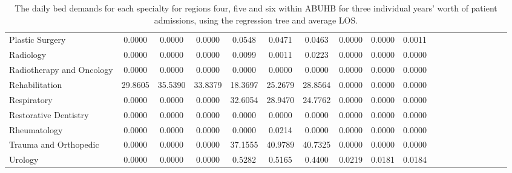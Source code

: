\documentclass[thesis.tex]{subfiles}
\begin{document}
\begin{landscape}
\begin{table}[h!]
{\begin{tabular}{lcccccccccccccccccc}
Plastic Surgery	&0.0000&	0.0000&	0.0000&	0.0548&	0.0471&	0.0463&	0.0000&	0.0000&	0.0011\\
Radiology&	0.0000&	0.0000&	0.0000&	0.0099&	0.0011&	0.0223&	0.0000&	0.0000&	0.0000\\
Radiotherapy and Oncology&	0.0000&	0.0000&	0.0000&	0.0000&	0.0000	&0.0000&	0.0000&	0.0000&	0.0000\\
Rehabilitation&	29.8605&	35.5390&	33.8379&	18.3697&	25.2679&	28.8564&	0.0000&	0.0000&	0.0000\\
Respiratory&	0.0000&	0.0000&	0.0000&	32.6054&	28.9470&	24.7762&	0.0000&	0.0000&	0.0000\\
Restorative Dentistry	&0.0000&	0.0000&	0.0000&	0.0000&	0.0000&	0.0000&	0.0000&	0.0000&	0.0000\\
Rheumatology&	0.0000&	0.0000&	0.0000&	0.0000&	0.0214&	0.0000&	0.0000&	0.0000&	0.0000\\
Trauma and Orthopedic&	0.0000&	0.0000&	0.0000&	37.1555&	40.9789	&40.7325&	0.0000&	0.0000&	0.0000\\
Urology&	0.0000&	0.0000&	0.0000&	0.5282&	0.5165&	0.4400&	0.0219&	0.0181&	0.0184\\
\bottomrule


\end{tabular}  } 
\caption{The daily bed demands for each specialty for regions four, five and six within ABUHB for three individual years’ worth of patient admissions, using the regression tree and average LOS.}
    \label{apptab:LinkedDemands2b}
\end{table}


\end{landscape}
\end{document}
